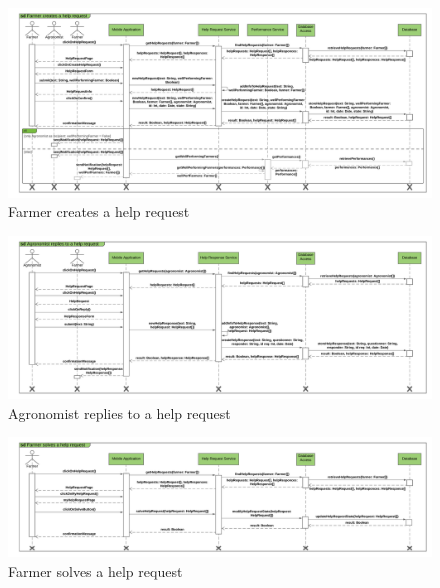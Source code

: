 \newpage
\begin{landscape}
\begin{figure}[h]
\vspace*{-2cm}
\noindent
\centering
\centerline{\includegraphics[scale= 0.108]{./Images/Farmer creates a help request.png}}
    \caption{Farmer creates a help request}
    \vspace*{-12cm}
\end{figure}
\fillandplacepagenumber
\end{landscape}

\newpage
\begin{landscape}
\begin{figure}[h]
\vspace*{-2cm}
\noindent
\centering
\centerline{\includegraphics[scale= 0.108]{./Images/Agronomist replies to a help request.png}}
    \caption{Agronomist replies to a help request}
    \vspace*{-12cm}
\end{figure}
\fillandplacepagenumber
\end{landscape}

\newpage
\begin{landscape}
\begin{figure}[h]
\vspace*{-2cm}
\noindent
\centering
\centerline{\includegraphics[scale= 0.108]{./Images/Farmer solves a help request.png}}
    \caption {Farmer solves a help request}
    \vspace*{-12cm}
\end{figure}
\fillandplacepagenumber
\end{landscape}


